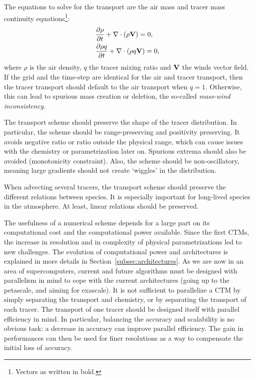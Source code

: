 The equations to solve for the transport are the air mass and tracer mass
continuity equations\footnote{Vectors as written in bold.}:
\begin{align}
  &\frac{\partial \rho}{\partial t} + \nabla \cdot (\rho {\bf V}) = 0 ,
\label{eqn:air}
  \\
  &\frac{\partial \rho q}{\partial t} + \nabla \cdot ( \rho q {\bf V})  = 0,
\label{eqn:tracer}
\end{align}
where $\rho$ is the air density, $q$ the tracer mixing ratio and ${\bf V}$ the
winds vector field. If the grid and the time-step are identical for the air and
tracer transport, then the tracer transport should default to the air transport
when $q=1$. Otherwise, this can lead to spurious mass creation or
deletion, the so-called \textit{mass-wind inconsistency}. 

The transport scheme should preserve the shape of the tracer distribution. In
particular, the scheme should be range-preserving and positivity preserving. It
avoids negative ratio or ratio outside the physical range, which can cause
issues with the chemistry or parametrization later on. Spurious extrema should
also be avoided (monotonicity constraint). Also, the scheme
should be non-oscillatory, meaning large gradients should not create `wiggles'
in the distribution.

When advecting several tracers, the transport scheme should preserve the
different relations between species. It is especially important for long-lived
species in the atmosphere. At least, linear relations should be
preserved.

The usefulness of a numerical scheme depends for a large part on its
computational cost and the computational power available.  Since the first
\gls{CTM}s, the increase in resolution and in complexity of physical
parametrizations led to new challenges. The evolution of computational power and
architectures is explained in more details in
Section~\ref{subsec:architectures}. As we are now in an area of supercomputers,
current and future algorithms must be designed with parallelism in mind to cope
with the current architectures (going up to the petascale, and aiming for
exascale). It is not sufficient to parallelize a CTM by simply separating the
transport and chemistry, or by separating the transport of each tracer. The
transport of one tracer should be designed itself with parallel efficiency in
mind. In particular, balancing the accuracy and scalability is no obvious task:
a decrease in accuracy can improve parallel efficiency. The gain in performances
can then be used for finer resolutions as a way to compensate the initial loss of accuracy.

